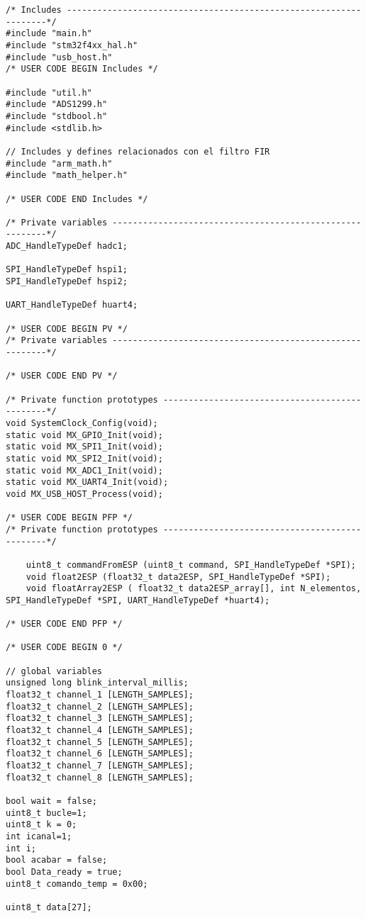 \begin{lstlisting}[label=algoritmo:main.c,style = STM-code,frame=single,caption=main.c]
/* Includes ------------------------------------------------------------------*/
#include "main.h"
#include "stm32f4xx_hal.h"
#include "usb_host.h"
/* USER CODE BEGIN Includes */

#include "util.h"
#include "ADS1299.h"
#include "stdbool.h"
#include <stdlib.h>

// Includes y defines relacionados con el filtro FIR
#include "arm_math.h"
#include "math_helper.h"

/* USER CODE END Includes */

/* Private variables ---------------------------------------------------------*/
ADC_HandleTypeDef hadc1;

SPI_HandleTypeDef hspi1;
SPI_HandleTypeDef hspi2;

UART_HandleTypeDef huart4;

/* USER CODE BEGIN PV */
/* Private variables ---------------------------------------------------------*/

/* USER CODE END PV */

/* Private function prototypes -----------------------------------------------*/
void SystemClock_Config(void);
static void MX_GPIO_Init(void);
static void MX_SPI1_Init(void);
static void MX_SPI2_Init(void);
static void MX_ADC1_Init(void);
static void MX_UART4_Init(void);
void MX_USB_HOST_Process(void);

/* USER CODE BEGIN PFP */
/* Private function prototypes -----------------------------------------------*/

	uint8_t commandFromESP (uint8_t command, SPI_HandleTypeDef *SPI);
	void float2ESP (float32_t data2ESP, SPI_HandleTypeDef *SPI);
	void floatArray2ESP ( float32_t data2ESP_array[], int N_elementos, SPI_HandleTypeDef *SPI, UART_HandleTypeDef *huart4);

/* USER CODE END PFP */

/* USER CODE BEGIN 0 */

// global variables
unsigned long blink_interval_millis;
float32_t channel_1 [LENGTH_SAMPLES];
float32_t channel_2 [LENGTH_SAMPLES];
float32_t channel_3 [LENGTH_SAMPLES];
float32_t channel_4 [LENGTH_SAMPLES];
float32_t channel_5 [LENGTH_SAMPLES];
float32_t channel_6 [LENGTH_SAMPLES];
float32_t channel_7 [LENGTH_SAMPLES];
float32_t channel_8 [LENGTH_SAMPLES];

bool wait = false;
uint8_t bucle=1;
uint8_t k = 0;
int icanal=1;
int i;
bool acabar = false;
bool Data_ready = true;
uint8_t comando_temp = 0x00;

uint8_t data[27];


\end{lstlisting}
